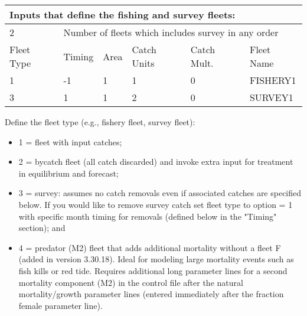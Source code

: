 \begin{center}
	\begin{tabular}{p{2cm} p{2cm} p{2cm} p{2cm} p{2cm} p{4cm} }
		\multicolumn{6}{l}{Inputs that define the fishing and survey fleets:}\\
		\hline
		2 & \multicolumn{5}{l}{Number of fleets which includes survey in any order} \Tstrut\Bstrut\\

		\hline
		Fleet Type & Timing & Area & Catch Units & Catch Mult. & Fleet Name \Tstrut\Bstrut\\

		\hline
		1 & -1 & 1 & 1 & 0 & FISHERY1 \Tstrut\\
		3 &  1 & 1 & 2 & 0 & SURVEY1 \Bstrut\\
		\hline
		
	\end{tabular}
\end{center}

Define the fleet type (e.g., fishery fleet, survey fleet):
	  \begin{itemize}
	  	\item 1 = fleet with input catches;
	  	\item 2 = bycatch fleet (all catch discarded) and invoke extra input for treatment in equilibrium and forecast;
	  	\item 3 = survey: assumes no catch removals even if associated catches are specified below.  If you would like to remove survey catch set fleet type to option = 1 with specific month timing for removals (defined below in the "Timing" section); and 
	  	\item 4 = predator (M2) fleet that adds additional mortality without a fleet F (added in version 3.30.18). Ideal for modeling large mortality events such as fish kills or red tide. Requires additional long parameter lines for a second mortality component (M2) in the control file after the natural mortality/growth parameter lines (entered immediately after the fraction female parameter line).
	  \end{itemize}

